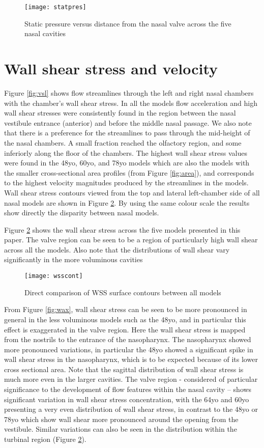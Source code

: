 \begin{figure} 
  \texttt{[image: statpres]}
  \caption{Static pressure versus distance from the nasal valve across the five nasal cavities}
  \label{fig:stpr}
\end{figure}

\section{Wall shear stress and velocity}
Figure \ref{fig:vsl} shows flow streamlines through the left and right nasal chambers with the chamber’s wall shear stress. In all the models flow acceleration and high wall shear stresses were consistently found in the region between the nasal vestibule entrance (anterior) and before the middle nasal passage. We also note that there is a preference for the streamlines to pass through the mid-height of the nasal chambers. A small fraction reached the olfactory region, and some inferiorly along the floor of the chambers. The highest wall shear stress values were found in the 48yo, 60yo, and 78yo models which are also the models with the smaller cross-sectional area profiles (from Figure \ref{fig:area}), and corresponds to the highest velocity magnitudes produced by the streamlines in the models. Wall shear stress contours viewed from the top and lateral left-chamber side of all nasal models are shown in Figure \ref{fig:wcont}. By using the same colour scale the results show directly the disparity between nasal models.

Figure \ref{fig:wcont} shows the wall shear stress across the five models presented in this paper. The valve region can be seen to be a region of particularly high wall shear across all the models. Also note that the distributions of wall shear vary significantly in the more voluminous cavities

\begin{figure} 
  \texttt{[image: wsscont]}
  \caption{Direct comparison of WSS surface contours between all models}
    \label{fig:wcont}
\end{figure}

From Figure \ref{fig:wax}, wall shear stress can be seen to be more pronounced in general in the less voluminous models such as the 48yo, and in particular this effect is exaggerated in the valve region. Here the wall shear stress is mapped from the nostrils to the entrance of the nasopharynx. The nasopharynx showed more pronounced variations, in particular the 48yo showed a significant spike in wall shear stress in the nasopharynx, which is to be expected because of its lower cross sectional area. Note that the sagittal distribution of wall shear stress is much more even in the larger cavities.  The valve region - considered of particular significance to the development of flow features within the nasal cavity \cite{Lindemann2008} – shows significant variation in wall shear stress concentration, with the 64yo and 60yo presenting a very even distribution of wall shear stress, in contrast to the 48yo or 78yo which show wall shear more pronounced around the opening from the vestibule. Similar variations can also be seen in the distribution within the turbinal region (Figure \ref{fig:wcont}). 

